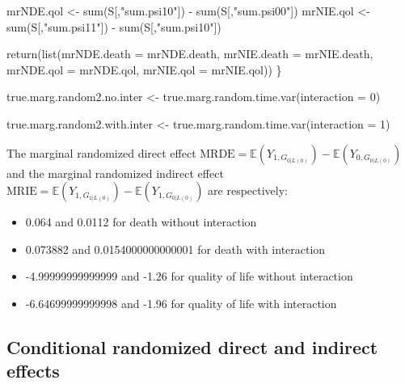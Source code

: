 \documentclass[
]{book}
\newenvironment{Shaded}{\begin{snugshade}}{\end{snugshade}}
\newcommand{\AttributeTok}[1]{\textcolor[rgb]{0.77,0.63,0.00}{#1}}
\newcommand{\DecValTok}[1]{\textcolor[rgb]{0.00,0.00,0.81}{#1}}
\newcommand{\FunctionTok}[1]{\textcolor[rgb]{0.00,0.00,0.00}{#1}}
\newcommand{\NormalTok}[1]{#1}
\newcommand{\OtherTok}[1]{\textcolor[rgb]{0.56,0.35,0.01}{#1}}
\newcommand{\SpecialCharTok}[1]{\textcolor[rgb]{0.00,0.00,0.00}{#1}}
\newcommand{\StringTok}[1]{\textcolor[rgb]{0.31,0.60,0.02}{#1}}
\providecommand{\tightlist}{%
  \setlength{\itemsep}{0pt}\setlength{\parskip}{0pt}}
\begin{document}
\begin{Shaded}
\begin{Highlighting}[]
\NormalTok{  mrNDE.qol }\OtherTok{\textless{}{-}} \FunctionTok{sum}\NormalTok{(S[,}\StringTok{"sum.psi10"}\NormalTok{]) }\SpecialCharTok{{-}} \FunctionTok{sum}\NormalTok{(S[,}\StringTok{"sum.psi00"}\NormalTok{])}
\NormalTok{  mrNIE.qol }\OtherTok{\textless{}{-}} \FunctionTok{sum}\NormalTok{(S[,}\StringTok{"sum.psi11"}\NormalTok{]) }\SpecialCharTok{{-}} \FunctionTok{sum}\NormalTok{(S[,}\StringTok{"sum.psi10"}\NormalTok{])}
  
  \FunctionTok{return}\NormalTok{(}\FunctionTok{list}\NormalTok{(}\AttributeTok{mrNDE.death =}\NormalTok{ mrNDE.death, }\AttributeTok{mrNIE.death =}\NormalTok{ mrNIE.death, }
              \AttributeTok{mrNDE.qol =}\NormalTok{ mrNDE.qol, }\AttributeTok{mrNIE.qol =}\NormalTok{ mrNIE.qol))}
\NormalTok{\}}
\end{Highlighting}
\end{Shaded}

\begin{Shaded}
\begin{Highlighting}[]
\NormalTok{true.marg.random2.no.inter }\OtherTok{\textless{}{-}} \FunctionTok{true.marg.random.time.var}\NormalTok{(}\AttributeTok{interaction =} \DecValTok{0}\NormalTok{)}

\NormalTok{true.marg.random2.with.inter }\OtherTok{\textless{}{-}} \FunctionTok{true.marg.random.time.var}\NormalTok{(}\AttributeTok{interaction =} \DecValTok{1}\NormalTok{)}
\end{Highlighting}
\end{Shaded}

The marginal randomized direct effect \(\text{MRDE}=\mathbb{E}\left(Y_{1,G_{0|L(0)}}\right) - \mathbb{E}\left(Y_{0,G_{0|L(0)}}\right)\) and the marginal randomized indirect effect \(\text{MRIE}=\mathbb{E}\left(Y_{1,G_{1|L(0)}}\right) - \mathbb{E}\left(Y_{1,G_{0|L(0)}}\right)\) are respectively:

\begin{itemize}
\tightlist
\item
  0.064 and 0.0112 for death without interaction
\item
  0.073882 and 0.0154000000000001 for death with interaction
\item
  -4.99999999999999 and -1.26 for quality of life without interaction
\item
  -6.64699999999998 and -1.96 for quality of life with interaction
\end{itemize}

\hypertarget{conditional-randomized-direct-and-indirect-effects-1}{%
\subsection{Conditional randomized direct and indirect effects}\label{conditional-randomized-direct-and-indirect-effects-1}}
\end{document}
